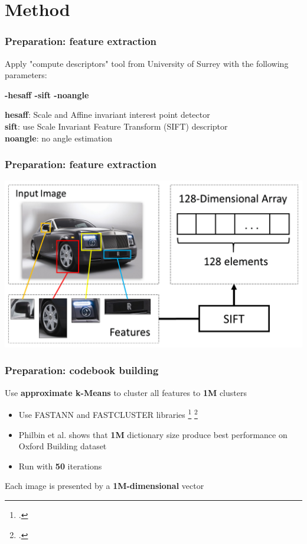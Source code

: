 \section{Method}

\begin{frame}
	\frametitle{Preparation: feature extraction}
	Apply "compute descriptors" tool from \alert{University of Surrey} with the following parameters:
	\begin{center}
		\textbf{-hesaff -sift -noangle}
	\end{center}
	\textbf{hesaff}: Scale and Affine invariant interest point detector\\
	\textbf{sift}: use Scale Invariant Feature Transform (SIFT) descriptor\\
	\textbf{noangle}: no angle estimation
\end{frame}

\begin{frame}
	\frametitle{Preparation: feature extraction}
	\begin{center}
	\includegraphics[width=\textwidth]{images/feature_extraction2.png}
	\end{center}
\end{frame}

\begin{frame}
	\frametitle{Preparation: codebook building}
	Use \textbf{approximate k-Means} to cluster all features to \textbf{1M} clusters
	\begin{itemize}
		\item Use \alert{FASTANN} and \alert{FASTCLUSTER} libraries \footcite{Muja, M. and Lowe, D.
Fast approximate nearest neighbours with automatic algorithm configuration
Proceedings of the International Conference on Computer Vision Theory and Applications (2009)} \footcite{Philbin, J. , Chum, O. , Isard, M. , Sivic, J. and Zisserman, A.
Object retrieval with large vocabularies and fast spatial matching
Proceedings of the IEEE Conference on Computer Vision and Pattern Recognition (2007)}
		\item \alert{Philbin et al.} shows that \textbf{1M} dictionary size produce best performance on \alert{Oxford Building} dataset
		\item Run with \textbf{50} iterations
	\end{itemize}
	Each image is presented by a \textbf{1M-dimensional} vector
\end{frame}

